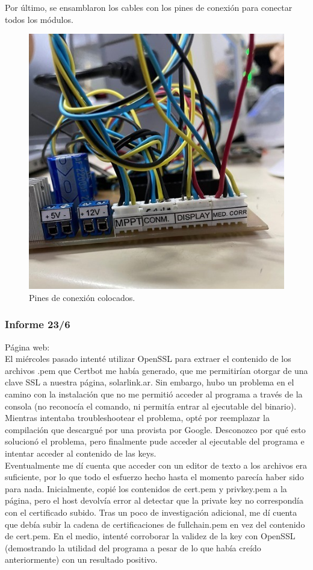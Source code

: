 Por último, se ensamblaron los cables con los pines de conexión para conectar todos los módulos.\\

\begin{figure}[H]
    \centering
    \includegraphics[width=0.7\linewidth]{informes/IMG_8481.jpg}
    \caption{Pines de conexión colocados.}
\end{figure}

\subsubsection{Informe 23/6}

Página web:\\

El miércoles pasado intenté utilizar OpenSSL para extraer el contenido de los archivos .pem que Certbot me había generado, que me permitirían otorgar de una clave SSL a nuestra página, solarlink.ar. Sin embargo, hubo un problema en el camino con la instalación que no me permitió acceder al programa a través de la consola (no reconocía el comando, ni permitía entrar al ejecutable del binario). Mientras intentaba troubleshootear el problema, opté por reemplazar la compilación que descargué  por una provista por Google. Desconozco por qué esto solucionó el problema, pero finalmente pude acceder al ejecutable del programa e intentar acceder al contenido de las keys.\\

Eventualmente me dí cuenta que acceder con un editor de texto a los archivos era suficiente, por lo que todo el esfuerzo hecho hasta el momento parecía haber sido para nada. Inicialmente, copié los contenidos de cert.pem y privkey.pem a la página, pero el host devolvía error al detectar que la private key no correspondía con el certificado subido. Tras un poco de investigación adicional, me dí cuenta que debía subir la cadena de certificaciones de fullchain.pem en vez del contenido de cert.pem. En el medio, intenté corroborar la validez de la key con OpenSSL (demostrando la utilidad del programa a pesar de lo que había creído anteriormente) con un resultado positivo.\\

